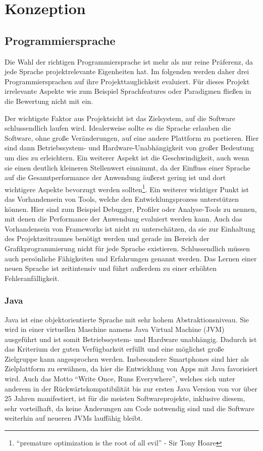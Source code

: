 \chapter{Konzeption}

\section{Programmiersprache}
Die Wahl der richtigen Programmiersprache ist mehr als nur reine Präferenz, da jede Sprache projektrelevante Eigenheiten hat. Im folgenden werden daher drei Programmiersprachen auf ihre Projekttauglichkeit evaluiert. Für dieses Projekt irrelevante Aspekte wie zum Beispiel Sprachfeatures oder Paradigmen fließen in die Bewertung nicht mit ein.

Der wichtigste Faktor aus Projektsicht ist das Zielsystem, auf die Software schlussendlich laufen wird. Idealerweise sollte es die Sprache erlauben die Software, ohne große Veränderungen, auf eine andere Plattform zu portieren. Hier sind dann Betriebssystem- und Hardware-Unabhängigkeit von großer Bedeutung um dies zu erleichtern. Ein weiterer Aspekt ist die Geschwindigkeit, auch wenn sie einen deutlich kleineren Stellenwert einnimmt, da der Einfluss einer Sprache auf die Gesamtperformance der Anwendung äußerst gering ist und dort wichtigere Aspekte bevorzugt werden sollten\footnote{“premature optimization is the root of all evil” - Sir Tony Hoare}. Ein weiterer wichtiger Punkt ist das Vorhandensein von Tools, welche den Entwicklungsprozess unterstützen können. Hier sind zum Beispiel Debugger, Profiler oder Analyse-Tools zu nennen, mit denen die Performance der Anwendung evaluiert werden kann. Auch das Vorhandensein von Frameworks ist nicht zu unterschätzen, da sie zur Einhaltung des Projektzeitraumes benötigt werden und gerade im Bereich der Grafikprogrammierung nicht für jede Sprache existieren. Schlussendlich müssen auch persönliche Fähigkeiten und Erfahrungen genannt werden. Das Lernen einer neuen Sprache ist zeitintensiv und führt außerdem zu einer erhöhten Fehleranfälligkeit.

\subsection{Java}
Java ist eine objektorientierte Sprache mit sehr hohem Abstraktionsniveau. Sie wird in einer virtuellen Maschine namens Java Virtual Machine (JVM) ausgeführt und ist somit Betriebssystem- und Hardware unabhängig. Dadurch ist das Kriterium der guten Verfügbarkeit erfüllt und eine möglichst große Zielgruppe kann angesprochen werden. Insbesondere Smartphones sind hier als Zielplattform zu erwähnen, da hier die Entwicklung von Apps mit Java favorisiert wird. Auch das Motto “Write Once, Runs Everywhere”, welches sich unter anderem in der Rückwärtskompatibilität bis zur ersten Java Version von vor über 25 Jahren manifestiert, ist für die meisten Softwareprojekte, inklusive diesem, sehr vorteilhaft, da keine Änderungen am Code notwendig sind und die Software weiterhin auf neueren JVMs lauffähig bleibt.

